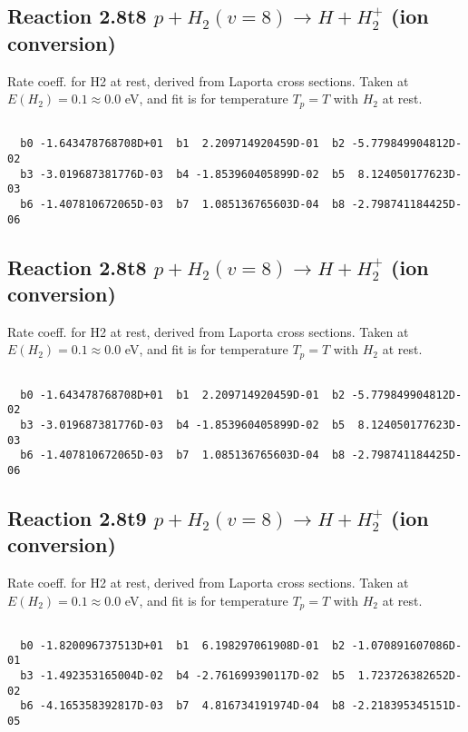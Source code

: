\documentclass[12pt,dvipdfmx]{article}
\begin{document}
\newpage
\subsection{
Reaction 2.8t8
$ p + H_2(v=8) \rightarrow H + H_2^+$ (ion conversion)
}
Rate coeff. for H2 at rest, derived from Laporta cross sections.
Taken at $E(H_2) = 0.1 \approx 0.0$ eV,  and fit is for temperature $T_p=T$ with $H_2$ at rest.

\begin{small}\begin{verbatim}

  b0 -1.643478768708D+01  b1  2.209714920459D-01  b2 -5.779849904812D-02
  b3 -3.019687381776D-03  b4 -1.853960405899D-02  b5  8.124050177623D-03
  b6 -1.407810672065D-03  b7  1.085136765603D-04  b8 -2.798741184425D-06

\end{verbatim}\end{small}

\newpage
\subsection{
Reaction 2.8t8
$ p + H_2(v=8) \rightarrow H + H_2^+$ (ion conversion)
}
Rate coeff. for H2 at rest, derived from Laporta cross sections.
Taken at $E(H_2) = 0.1 \approx 0.0$ eV,  and fit is for temperature $T_p=T$ with $H_2$ at rest.

\begin{small}\begin{verbatim}

  b0 -1.643478768708D+01  b1  2.209714920459D-01  b2 -5.779849904812D-02
  b3 -3.019687381776D-03  b4 -1.853960405899D-02  b5  8.124050177623D-03
  b6 -1.407810672065D-03  b7  1.085136765603D-04  b8 -2.798741184425D-06

\end{verbatim}\end{small}

\newpage
\subsection{
Reaction 2.8t9
$ p + H_2(v=8) \rightarrow H + H_2^+$ (ion conversion)
}
Rate coeff. for H2 at rest, derived from Laporta cross sections.
Taken at $E(H_2) = 0.1 \approx 0.0$ eV,  and fit is for temperature $T_p=T$ with $H_2$ at rest.

\begin{small}\begin{verbatim}

  b0 -1.820096737513D+01  b1  6.198297061908D-01  b2 -1.070891607086D-01
  b3 -1.492353165004D-02  b4 -2.761699390117D-02  b5  1.723726382652D-02
  b6 -4.165358392817D-03  b7  4.816734191974D-04  b8 -2.218395345151D-05

\end{verbatim}\end{small}
\end{document}
